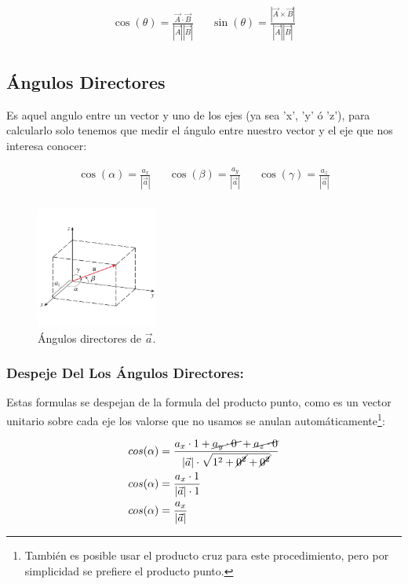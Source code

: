 \documentclass{article}
\begin{document}
\[ \begin{aligned}
\cos(\theta) = \frac{\vec{A} \cdot \vec{B}}{|\vec{A}||\vec{B}|} &&
\sin(\theta) = \frac{|\vec{A}\times\vec{B}|}{|\vec{A}||\vec{B}|} \\
\end{aligned} \]

\subsection{Ángulos Directores}
\label{sec:org6da399a}
Es aquel angulo entre un vector y uno de los ejes (ya sea 'x', 'y' ó 'z'), para calcularlo solo tenemos que medir el ángulo entre nuestro vector y el eje que nos interesa conocer:

\[\begin{aligned}
  \cos(\alpha) = \frac{a_x}{|\vec{a}|} &&
  \cos(\beta)  = \frac{a_y}{|\vec{a}|} &&
  \cos(\gamma) = \frac{a_z}{|\vec{a}|} \\
\end{aligned} \]

\begin{figure}[htbp]
\centering
\includegraphics[width=4cm]{img/angulos-directores.png}
\caption{Ángulos directores de \(\vec{a}\).}
\end{figure}


\subsubsection*{Despeje Del Los Ángulos Directores:}
\label{sec:org3eebf16}
Estas formulas se despejan de la formula del producto punto, como es un vector unitario sobre cada eje los valorse que no usamos se anulan automáticamente\footnote{También es posible usar el producto cruz para este procedimiento, pero por simplicidad se prefiere el producto punto.}:

\[\begin{aligned}
  cos(\alpha) &= \frac{a_x \cdot 1 + \cancel{a_y \cdot 0~} + \cancel{a_z \cdot 0} }{|\vec{a}| \cdot \sqrt{1^2+\cancel{0^2}+\cancel{0^2}}} \\
  cos(\alpha) &= \frac{a_x \cdot 1}{|\vec{a}| \cdot 1} \\
  cos(\alpha) &= \frac{a_x}{|\vec{a}|} \\
\end{aligned} \]
\end{document}
